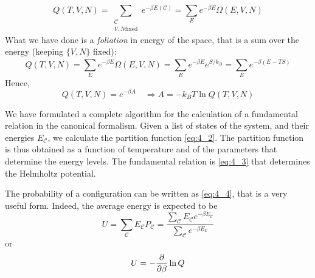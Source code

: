 \documentclass[../../Main/Main.tex]{subfiles}
\begin{document}
\begin{remark}
\begin{equation*}
  Q(T,V,N) = \sum_{\substack{ \mathcal{C} \\ V,N \text{fixed} }} e^{-\beta E (\mathcal{C})} = \sum_{E}^{} e^{-\beta E} \Omega (E,V,N)
\end{equation*}
What we have done is a \emph{foliation} in energy of the space, that is a sum over the energy (keeping \( \{V,N\} \) fixed):
\begin{equation*}
  Q(T,V,N) = \sum_{E}^{} e^{-\beta E} \Omega (E,V,N) = \sum_{E}^{} e^{-\beta E} e^{S/k_B} = \sum_{E}^{} e^{-\beta (E-T S)}
\end{equation*}
Hence,
\begin{equation*}
  Q(T,V,N) = e^{-\beta A} \quad \Rightarrow A = - k_B T \ln{Q(T,V,N)}
\end{equation*}
\end{remark}

We have formulated a complete algorithm for the calculation of a fundamental relation in the canonical formalism. Given a list of states of the system, and their energies \( E_ {\mathcal{C}} \), we calculate the partition function \eqref{eq:4_2}. The partition function is thus obtained as a function of temperature and of the parameters that determine the energy levels. The fundamental relation is \eqref{eq:4_3} that determines the Helmholtz potential.

The probability of a configuration can be written as \eqref{eq:4_4}, that is a very useful form. Indeed, the average energy is expected to be
\begin{equation}
  U = \sum_{\mathcal{C}}^{} E_ {\mathcal{C}} P_{\mathcal{C}}  = \frac{ \sum_{\mathcal{C}}^{} E_ {\mathcal{C}} e^{-\beta E_ \mathcal{C}}}{\sum_{\mathcal{C}}^{} e^{-\beta E_ \mathcal{C}} }
\end{equation}
or
\begin{equation}
  U =  -\pdv{}{\beta } \ln{Q}
\end{equation}
\end{document}
